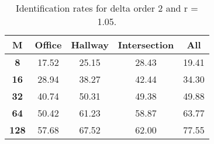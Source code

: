\begin{table}[h]
    \small
    \centering
    \begin{tabular}{|c|c|c|c|l|}    
    \hline
    {\bf M} & {\bf Office} & {\bf Hallway} & {\bf Intersection} &     \multicolumn{1}{c|}{{\bf All}} \\ \hline
    {\bf 8} & 17.52 & 25.15 & 28.43 & 19.41 \\ \hline
    {\bf 16} & 28.94 & 38.27 & 42.44 & 34.30 \\ \hline
    {\bf 32} & 40.74 & 50.31 & 49.38 & 49.88 \\ \hline
    {\bf 64} & 50.42 & 61.23 & 58.87 & 63.77 \\ \hline
    {\bf 128} & 57.68 & 67.52 & 62.00 & 77.55 \\ \hline
    \end{tabular}
    \caption{Identification rates for delta order 2 and r = 1.05.}    
    \label{tab:identify_speakers_1.05_mit_19_2}
\end{table}
